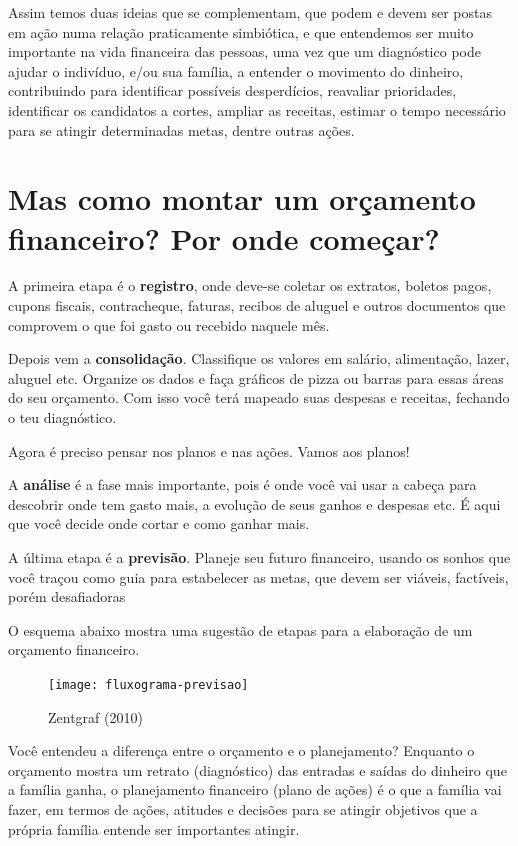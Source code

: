 Assim temos duas ideias que se complementam, que podem e devem ser postas em ação numa relação praticamente simbiótica, e que entendemos ser muito importante na vida financeira das pessoas, uma vez que um diagnóstico pode ajudar o indivíduo, e/ou sua família, a entender o movimento do dinheiro, contribuindo para identificar possíveis desperdícios, reavaliar prioridades, identificar os candidatos a cortes, ampliar as receitas, estimar o tempo necessário para se atingir determinadas metas, dentre outras ações.

\section{Mas como montar um orçamento financeiro? Por onde começar?}

A primeira etapa é o \textbf{registro}, onde deve-se coletar os extratos, boletos pagos, cupons fiscais, contracheque, faturas, recibos de aluguel e outros documentos que comprovem o que foi gasto ou recebido naquele mês.

Depois vem a \textbf{consolidação}. Classifique os valores em salário, alimentação, lazer, aluguel etc. Organize os dados e faça gráficos de pizza ou barras para essas áreas do seu orçamento. Com isso você terá mapeado suas despesas e receitas, fechando o teu diagnóstico.

Agora é preciso pensar nos planos e nas ações. Vamos aos planos!

A \textbf{análise} é a fase mais importante, pois é onde você vai usar a cabeça para descobrir onde tem gasto mais, a evolução de seus ganhos e despesas etc. É aqui que você decide onde cortar e como ganhar mais.   

A última etapa é a \textbf{previsão}. Planeje seu futuro financeiro, usando os sonhos que você traçou como guia para estabelecer as metas, que devem ser viáveis, factíveis, porém desafiadoras

O esquema abaixo mostra uma sugestão de etapas para a elaboração de um orçamento financeiro. 

\begin{figure}[H]
\centering
\texttt{[image: fluxograma-previsao]}

\caption{Zentgraf (2010)}
\end{figure}

Você entendeu a diferença entre o orçamento e o planejamento? Enquanto o orçamento mostra um retrato (diagnóstico) das entradas e saídas do dinheiro que a família ganha, o planejamento financeiro (plano de ações) é o que a família vai fazer, em termos de ações, atitudes e decisões para se atingir objetivos que a própria família entende ser importantes atingir. 

